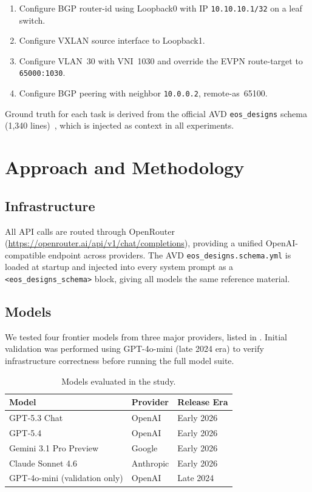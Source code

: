 \documentclass[11pt, letterpaper]{article}
\begin{document}
\begin{enumerate}
    \item Configure BGP router-id using Loopback0 with IP \texttt{10.10.10.1/32} on a leaf switch.
    \item Configure VXLAN source interface to Loopback1.
    \item Configure VLAN~30 with VNI~1030 and override the EVPN route-target to \texttt{65000:1030}.
    \item Configure BGP peering with neighbor \texttt{10.0.0.2}, remote-as~65100.
\end{enumerate}

Ground truth for each task is derived from the official AVD \texttt{eos\_designs} schema (1,340 lines)~\cite{avd_docs}, which is injected as context in all experiments.

\section{Approach and Methodology}
\label{sec:methodology}

\subsection{Infrastructure}
\label{sec:infra}

All API calls are routed through OpenRouter (\url{https://openrouter.ai/api/v1/chat/completions}), providing a unified OpenAI-compatible endpoint across providers. The AVD \texttt{eos\_designs.schema.yml} is loaded at startup and injected into every system prompt as a \texttt{<eos\_designs\_schema>} block, giving all models the same reference material.

\subsection{Models}
\label{sec:models}

We tested four frontier models from three major providers, listed in . Initial validation was performed using GPT-4o-mini (late 2024 era) to verify infrastructure correctness before running the full model suite.

\begin{table}[H]
\centering
\caption{Models evaluated in the study.}
\label{tab:models}
\begin{tabular}{lll}
\toprule
\textbf{Model} & \textbf{Provider} & \textbf{Release Era} \\
\midrule
GPT-5.3 Chat     & OpenAI    & Early 2026 \\
GPT-5.4           & OpenAI    & Early 2026 \\
Gemini 3.1 Pro Preview & Google & Early 2026 \\
Claude Sonnet 4.6 & Anthropic & Early 2026 \\
\midrule
GPT-4o-mini (validation only) & OpenAI & Late 2024 \\
\bottomrule
\end{tabular}
\end{table}
\end{document}
